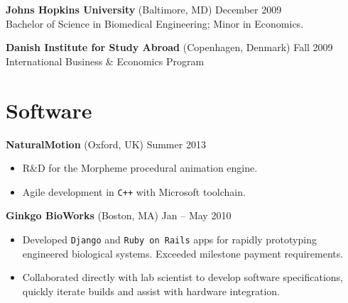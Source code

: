 \documentclass[margin]{res}
\newcommand{\locdatesubsection}[3]{\textbf{#1} (#2) \hfill #3}
\begin{document}
\begin{sloppypar}
\begin{resume}


\locdatesubsection{Johns Hopkins University}{Baltimore, MD}{December 2009}\\
Bachelor of Science in Biomedical Engineering; Minor in Economics. %

\locdatesubsection{Danish Institute for Study Abroad}{Copenhagen, Denmark}{Fall 2009}\\
International Business \& Economics Program


\section{Software}
\locdatesubsection{NaturalMotion}{Oxford, UK}{Summer 2013}
\begin{itemize}
\item R\&D for the Morpheme procedural animation engine. 
\item Agile development in \texttt{C++} with Microsoft toolchain.
\end{itemize}

\locdatesubsection{Ginkgo BioWorks}{Boston, MA}{Jan -- May 2010}
\begin{itemize}
\item Developed \texttt{Django} and \texttt{Ruby on Rails} apps for rapidly prototyping engineered biological systems. Exceeded milestone payment requirements.
\item Collaborated directly with lab scientist to develop software specifications, quickly iterate builds and assist with hardware integration.
\end{itemize}


\end{resume}
\end{sloppypar}
\end{document}
